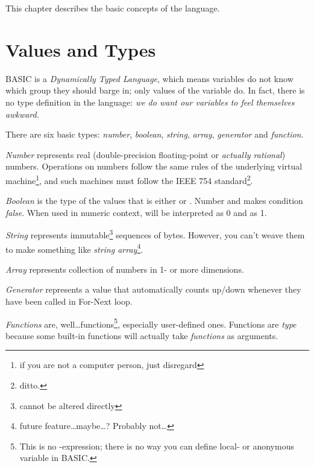This chapter describes the basic concepts of the language.


\section{Values and Types}
\label{valuesandtypes}

BASIC is a \emph{Dynamically Typed Language}, which means variables do not know which group they should barge in; only values of the variable do. In fact, there is no type definition in the language: \emph{we do want our variables to feel themselves awkward.}

There are six basic types: \emph{number}, \emph{boolean}, \emph{string},  \emph{array}, \emph{generator} and \emph{function}.

\emph{Number} represents real (double-precision floating-point or \emph{actually rational}) numbers. Operations on numbers follow the same rules of the underlying virtual machine\footnote{if you are not a computer person, just disregard}, and such machines must follow the IEEE 754 standard\footnote{ditto.}. 

\emph{Boolean} is the type of the values that is either  or . Number  and  makes condition \emph{false}. When used in numeric context,  will be interpreted as 0 and  as 1.

\emph{String} represents immutable\footnote{cannot be altered directly} sequences of bytes. However, you can't weave them to make something like \emph{string array}\footnote{future feature\ldots maybe\ldots? Probably not\ldots}.

\emph{Array} represents collection of numbers in 1- or more dimensions.

\emph{Generator} represents a value that automatically counts up/down whenever they have been called in For-Next loop.

\emph{Functions} are, well\ldots functions\footnote{This is no {\lambda}-expression; there is no way you can define local- or anonymous variable in BASIC.}, especially user-defined ones. Functions are \emph{type} because some built-in functions will actually take \emph{functions} as arguments.
